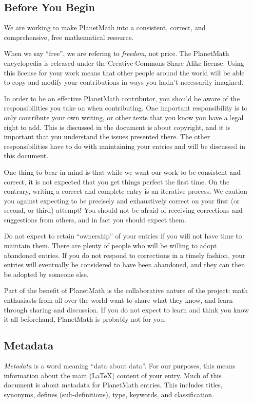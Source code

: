 \subsection{Before You Begin}
We are working to make PlanetMath into a consistent, correct, and
comprehensive, free mathematical resource.

When we say ``free'', we are refering to \emph{freedom}, not price.
The PlanetMath encyclopedia is released under the Creative Commons
Share Alike license.  Using this license for your work means that
other people around the world will be able to copy and modify your
contributions in ways you hadn't necessarily imagined.

In order to be an effective PlanetMath contributor, you should be
aware of the responsibilities you take on when contributing.
One important responsibility is to only contribute your own writing,
or other texts that you know you have a legal right to add. This is
discussed in the document is about copyright, and it is important that
you understand the issues presented there. The other responsibilities
have to do with maintaining your entries and will be discussed in this
document. 

One thing to bear in mind is that while we want our work to be
consistent and correct, it is not expected that you get things perfect
the first time. On the contrary, writing a correct and complete entry
is an iterative process. We caution you against expecting to be
precisely and exhaustively correct on your first (or second, or third)
attempt! You should not be afraid of receiving corrections and
suggestions from others, and in fact you should expect them.

Do not expect to retain ``ownership'' of your entries if you will not
have time to maintain them. There are plenty of people who will be
willing to adopt abandoned entries. If you do not respond to
corrections in a timely fashion, your entries will eventually be
considered to have been abandoned, and they can then be adopted by
someone else.

Part of the benefit of PlanetMath is the collaborative nature of the
project: math enthusiasts from all over the world want to share what
they know, and learn through sharing and discussion. If you do not
expect to learn and think you know it all beforehand, PlanetMath is
probably not for you.

\subsection{Metadata}
\textit{Metadata} is a word meaning ``data about data''. For our
purposes, this means information about the main (\LaTeX) content of
your entry. Much of this document is about metadata for PlanetMath
entries. This includes titles, synonyms, defines (sub-definitions),
type, keywords, and classification.

